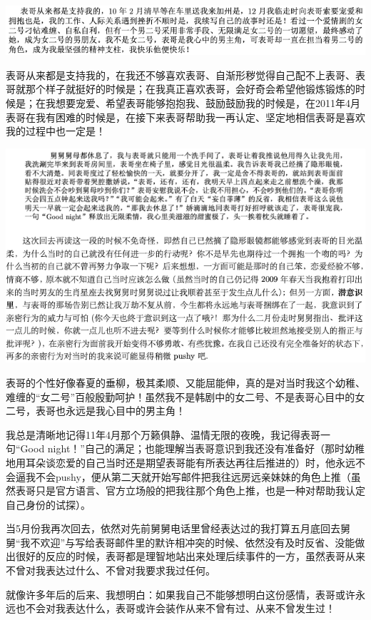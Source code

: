 \documentclass[9pt, b5paper]{article}
\begin{document}
\begin{center}
\includegraphics[width=.9\linewidth]{./pic/p1p135-2.png}
\end{center}

表哥从来都是支持我的，在我还不够喜欢表哥、自渐形秽觉得自己配不上表哥、表哥就那个样子就挺好的时候是；在我真正喜欢表哥，会好奇会希望他锻炼锻炼的时候是；在我想要宠爱、希望表哥能够抱抱我、鼓励鼓励我的时候是，在2011年4月表哥在我有困难的时候是，在接下来表哥帮助我一再认定、坚定地相信表哥是喜欢我的过程中也一定是！

\begin{center}
\includegraphics[width=.9\linewidth]{./pic/pfp41.png}
\end{center}

表哥的个性好像春夏的垂柳，极其柔顺、又能屈能伸，真的是对当时我这个幼稚、难缠的“女二号”百般殷勤呵护！虽然我不是韩剧中的女二号、不是表哥心目中的女二号，表哥也永远是我心目中的男主角！

我总是清晰地记得11年4月那个万籁俱静、温情无限的夜晚，我记得表哥一句“Good night！”自己的满足；也能理解当表哥意识到我还没有准备好（那时幼稚地用耳朵谈恋爱的自己当时还是期望表哥能有所表达再往后推进的）时，他永远不会逼我不会pushy，便从第二天就开始写邮件把我往远房远亲妹妹的角色上推（虽然表哥只是官方语言、官方立场般的把我往那个角色上推，也是一种对帮助我认定自己身份的试探）。

当5月份我再次回去，依然对先前舅舅电话里曾经表达过的我打算五月底回去舅舅“我不欢迎”与写给表哥邮件里的默许相冲突的时候、依然没有及时反省、没能做出很好的反应的时候，表哥都是理智地站出来处理后续事件的一方，虽然表哥从来不曾对我表达过什么、不曾对我要求我过任何。

就像许多年后的后来、我想明白：如果我自己不能够想明白这份感情，表哥或许永远也不会对我表达什么，表哥或许会装作从来不曾有过、从来不曾发生过！
\end{document}

